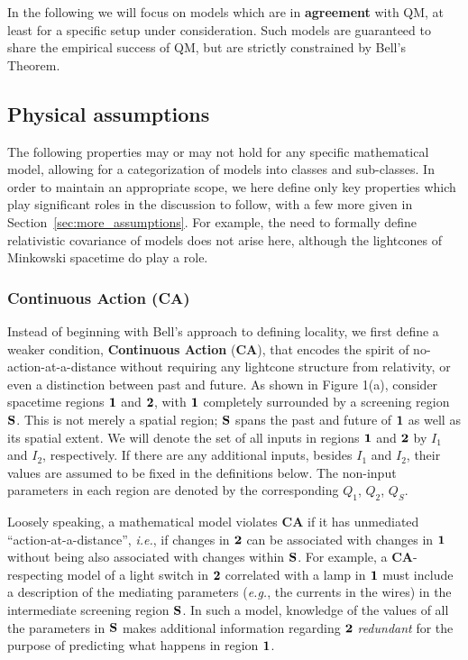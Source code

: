 \documentclass[onecolumn, nofootinbib, 12pt]{revtex4-1}
\begin{document}
In the following we will focus on models which are in {\bf agreement} with QM, at least for a specific setup under consideration.  Such models are guaranteed to share the empirical success of QM, but are strictly constrained by Bell's Theorem.


\subsection{Physical assumptions}
\label{sec:assumptions}

The following properties may or may not hold for any specific mathematical model, allowing for a categorization of models into classes and sub-classes.  In order to maintain an appropriate scope, we here define only key properties which play significant roles in the discussion to follow, with a few more given in Section~\ref{sec:more_assumptions}.  For example, the need to formally define relativistic covariance of models does not arise here, although the lightcones of Minkowski spacetime do play a role.

\subsubsection{Continuous Action {\rm ({\bf CA})}}

Instead of beginning with Bell's approach to defining locality, we first define a weaker condition, {\bf Continuous Action} ({\bf CA}), that encodes the spirit of no-action-at-a-distance without requiring any lightcone structure from relativity, or even a distinction between past and future.  As shown in Figure 1(a), consider spacetime regions $\bf{1}$ and $\bf{2}$, with $\bf{1}$ completely surrounded by a screening region $\bf{S}$.  This is not merely a spatial region; $\bf{S}$ spans the past and future of $\bf{1}$ as well as its spatial extent.  We will denote the set of all inputs in regions $\bf{1}$ and $\bf{2}$ by $I_1$ and $I_2$, respectively.  If there are any additional inputs, besides $I_1$ and $I_2$, their values are assumed to be fixed in the definitions below. The non-input parameters in each region are denoted by the corresponding $Q_1$, $Q_2$, $Q_S$.

Loosely speaking, a mathematical model violates {\bf CA} if it has unmediated ``action-at-a-distance'', \emph{i.e.}, if changes in $\bf{2}$ can be associated with changes in $\bf{1}$ without being also associated with changes within $\bf{S}$.  For example, a {\bf CA}-respecting model of a light switch in $\bf{2}$ correlated with a lamp in $\bf{1}$ must include a description of the mediating parameters (\emph{e.g.}, the currents in the wires) in the intermediate screening region $\bf{S}$. In such a model, knowledge of the values of all the parameters in $\bf{S}$ makes additional information regarding $\bf{2}$ \emph{redundant} for the purpose of predicting what happens in region $\bf{1}$.
\end{document}
